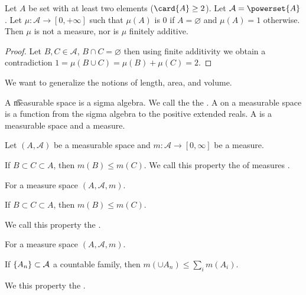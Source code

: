 \begin{expl}
Let $A$ be set with at least two elements ($\card{A} \geq 2$).
Let $\mathcal{A}  = \powerset{A}$.
Let $\mu : \mathcal{A}  \to [0, +\infty]$ such that $\mu (A)$ is $0$ if $A = \varnothing$ and $\mu (A) = 1$ otherwise.
Then $\mu $ is not a measure, nor is $\mu $ finitely additive.
\begin{proof}
Let $B, C \in \mathcal{A} $,
$B \cap  C = \varnothing$
then using finite additivity
we obtain a contradiction
$
1 = μ(B \cup C) = μ(B) + μ(C) = 2
$.
\end{proof}
\end{expl}


We want to generalize the notions of length, area, and volume.


A \t{measurable space}
is a sigma algebra.
We call the
the .
A
on a measurable space
is a function from the sigma algebra
to the positive extended reals.
A
is a measurable space and a measure.



\begin{prop}
Let $(A, \mathcal{A} )$ be a measurable space and
$m: \mathcal{A}  \to [0, \infty]$ be a measure.

If $B \subset C \subset A$, then $m(B) \leq m(C)$.
We call this property the of measures
.
\end{prop}

\begin{prop}
For a measure space $(A, \mathcal{A} , m)$.

If $B \subset C \subset A$, then $m(B) \leq m(C)$.

We call this property the
.
\end{prop}

\begin{prop}
For a measure space $(A, \mathcal{A} , m)$.

If $\{A_n\} \subset \mathcal{A} $ a countable family,
then $m(\cup A_n) \leq \sum_{i} m(A_i)$.

We this property the
.
\end{prop}

